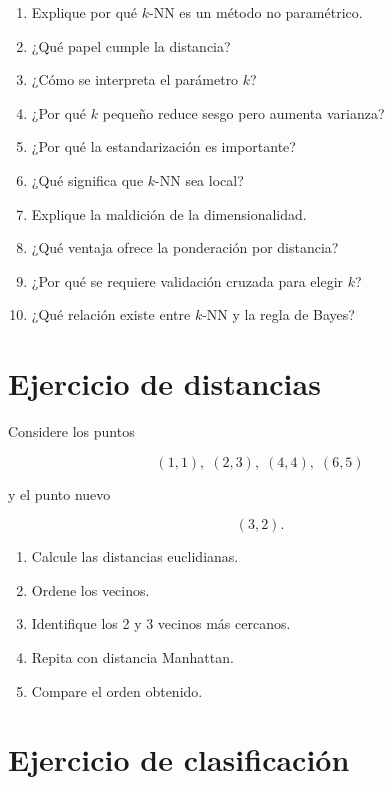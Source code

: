 \documentclass[
  spanish,
  10.5pt,
  letterpaper,
  DIV=11,
  numbers=noendperiod,
  oneside,
  open=any]{scrreprt}
\providecommand{\tightlist}{%
  \setlength{\itemsep}{0pt}\setlength{\parskip}{0pt}}
\theoremstyle{definition}
\theoremstyle{definition}
\theoremstyle{plain}
\theoremstyle{remark}
\begin{document}

\begin{enumerate}
\def\labelenumi{\arabic{enumi}.}
\tightlist
\item
  Explique por qué \(k\)-NN es un método no paramétrico.
\item
  ¿Qué papel cumple la distancia?
\item
  ¿Cómo se interpreta el parámetro \(k\)?
\item
  ¿Por qué \(k\) pequeño reduce sesgo pero aumenta varianza?
\item
  ¿Por qué la estandarización es importante?
\item
  ¿Qué significa que \(k\)-NN sea local?
\item
  Explique la maldición de la dimensionalidad.
\item
  ¿Qué ventaja ofrece la ponderación por distancia?
\item
  ¿Por qué se requiere validación cruzada para elegir \(k\)?
\item
  ¿Qué relación existe entre \(k\)-NN y la regla de Bayes?
\end{enumerate}

\section*{Ejercicio de distancias}\label{ejercicio-de-distancias}


Considere los puntos

\[
(1,1),\;(2,3),\;(4,4),\;(6,5)
\]

y el punto nuevo

\[
(3,2).
\]

\begin{enumerate}
\def\labelenumi{\arabic{enumi}.}
\tightlist
\item
  Calcule las distancias euclidianas.
\item
  Ordene los vecinos.
\item
  Identifique los 2 y 3 vecinos más cercanos.
\item
  Repita con distancia Manhattan.
\item
  Compare el orden obtenido.
\end{enumerate}

\section*{Ejercicio de
clasificación}\label{ejercicio-de-clasificaciuxf3n-2}
\end{document}
